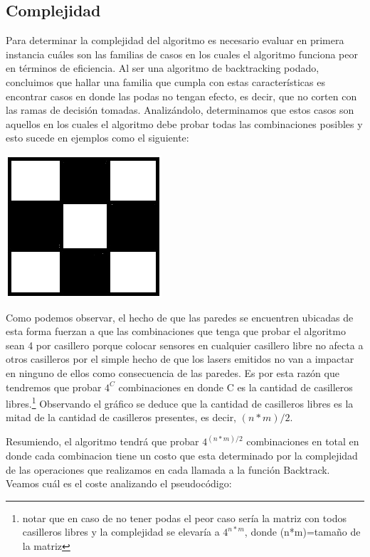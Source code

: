 \subsection{Complejidad}
Para determinar la complejidad del algoritmo es necesario evaluar en primera instancia cuáles son las familias de casos en los cuales el algoritmo funciona peor en términos de eficiencia. Al ser una algoritmo de backtracking podado, concluimos que hallar una familia que cumpla con estas características es encontrar casos en donde las podas no tengan efecto, es decir, que no corten con las ramas de decisión tomadas. Analizándolo, determinamos que estos casos son aquellos en los cuales el algoritmo debe probar todas las combinaciones posibles y esto sucede en ejemplos como el siguiente:

\includegraphics[scale=0.5]{ej3/imgs/ajedrezDibujo.png}

Como podemos observar, el hecho de que las paredes se encuentren ubicadas de esta forma fuerzan a que las combinaciones que tenga que probar el algoritmo sean 4 por casillero porque colocar sensores en cualquier casillero libre no afecta a otros casilleros por el simple hecho de que los lasers emitidos no van a impactar en ninguno de ellos como consecuencia de las paredes. Es por esta razón que tendremos que probar $4^C$ combinaciones en donde C es la cantidad de casilleros libres.\footnote{notar que en caso de no tener podas el peor caso sería la matriz con todos casilleros libres y la complejidad se elevaría a $4^{n*m}$, donde (n*m)=tamaño de la matriz} Observando el gráfico se deduce que la cantidad de casilleros libres es la mitad de la cantidad de casilleros presentes, es decir, $(n*m)/2$.

Resumiendo, el algoritmo tendrá que probar $4^{(n*m)/2}$ combinaciones en total en donde cada combinacion tiene un costo que esta determinado por la complejidad de las operaciones que realizamos en cada llamada a la función Backtrack. Veamos cuál es el coste analizando el pseudocódigo:

